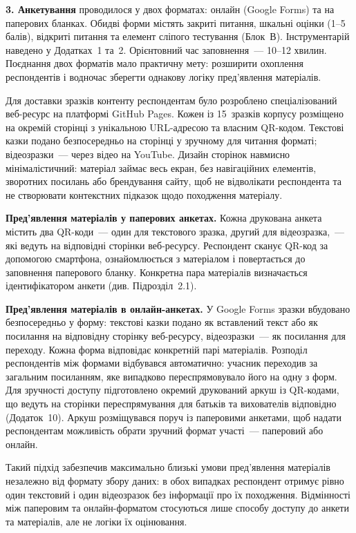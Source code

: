 \documentclass[14pt, a4paper]{extreport}
\begin{document}
\textbf{3. Анкетування} проводилося у двох форматах: онлайн (Google Forms) та на паперових бланках. Обидві форми містять закриті питання, шкальні оцінки (1--5 балів), відкриті питання та елемент сліпого тестування (Блок~В). Інструментарій наведено у Додатках~1 та~2. Орієнтовний час заповнення~--- 10--12 хвилин. Поєднання двох форматів мало практичну мету: розширити охоплення респондентів і водночас зберегти однакову логіку пред'явлення матеріалів.

Для доставки зразків контенту респондентам було розроблено спеціалізований веб-ресурс на платформі GitHub Pages. Кожен із 15~зразків корпусу розміщено на окремій сторінці з унікальною URL-адресою та власним QR-кодом. Текстові казки подано безпосередньо на сторінці у зручному для читання форматі; відеозразки~--- через відео на YouTube. Дизайн сторінок навмисно мінімалістичний: матеріал займає весь екран, без навігаційних елементів, зворотних посилань або брендування сайту, щоб не відволікати респондента та не створювати контекстних підказок щодо походження матеріалу.

\textbf{Пред'явлення матеріалів у паперових анкетах.} Кожна друкована анкета містить два QR-коди~--- один для текстового зразка, другий для відеозразка,~--- які ведуть на відповідні сторінки веб-ресурсу. Респондент сканує QR-код за допомогою смартфона, ознайомлюється з матеріалом і повертається до заповнення паперового бланку. Конкретна пара матеріалів визначається ідентифікатором анкети (див. Підрозділ~2.1).

\textbf{Пред'явлення матеріалів в онлайн-анкетах.} У Google Forms зразки вбудовано безпосередньо у форму: текстові казки подано як вставлений текст або як посилання на відповідну сторінку веб-ресурсу, відеозразки~--- як посилання для переходу. Кожна форма відповідає конкретній парі матеріалів. Розподіл респондентів між формами відбувався автоматично: учасник переходив за загальним посиланням, яке випадково переспрямовувало його на одну з форм. Для зручності доступу підготовлено окремий друкований аркуш із QR-кодами, що ведуть на сторінки переспрямування для батьків та вихователів відповідно (Додаток~10). Аркуш розміщувався поруч із паперовими анкетами, щоб надати респондентам можливість обрати зручний формат участі~--- паперовий або онлайн.

Такий підхід забезпечив максимально близькі умови пред'явлення матеріалів незалежно від формату збору даних: в обох випадках респондент отримує рівно один текстовий і один відеозразок без інформації про їх походження. Відмінності між паперовим та онлайн-форматом стосуються лише способу доступу до анкети та матеріалів, але не логіки їх оцінювання.
\end{document}
